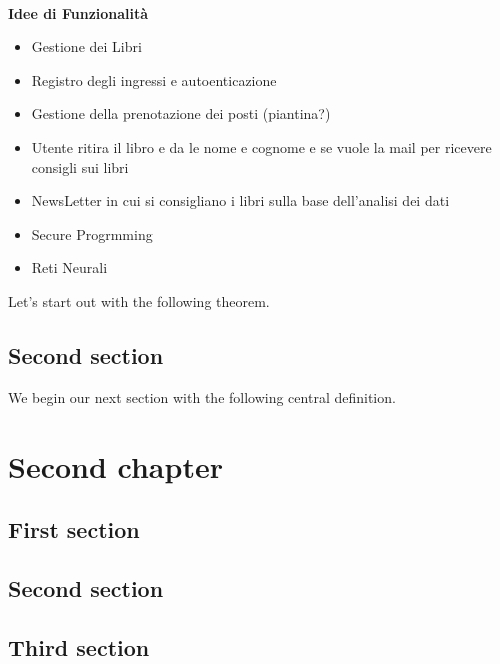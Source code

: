 \documentclass{tstextbook}
\begin{document}
	
	
\textbf{\Huge \\Idee di Funzionalità}
\begin{itemize}
	\item Gestione dei Libri
	\item Registro degli ingressi e autoenticazione 
	\item Gestione della prenotazione dei posti (piantina?)
	\item Utente ritira il libro e da le nome e cognome e se vuole la mail per ricevere consigli sui libri
	\item NewsLetter in cui si consigliano i libri sulla base dell'analisi dei dati
	\item Secure Progrmming
	\item Reti Neurali	
\end{itemize}

Let's start out with the following theorem.



\section{Second section}

We begin our next section with the following central definition.


\chapter{Second chapter}

\begin{summary}
  \blindtext
\end{summary}

\section{First section}
\Blindtext

\section{Second section}
\Blindtext

\section{Third section}
\Blindtext

\end{document}
